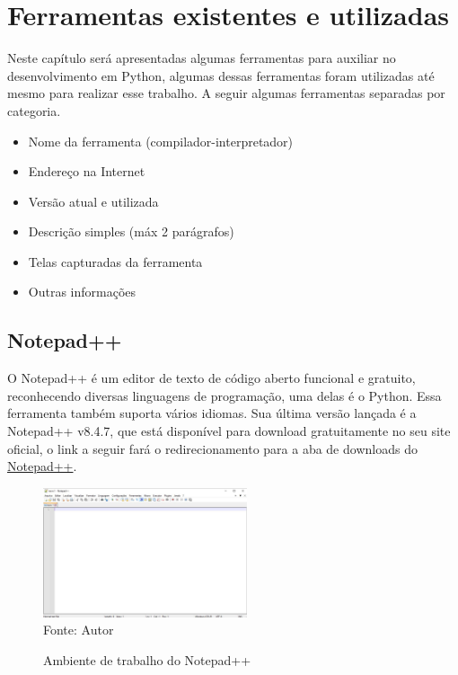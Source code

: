 

\chapter{Ferramentas existentes e utilizadas}

Neste capítulo será apresentadas algumas ferramentas para auxiliar no desenvolvimento em Python, algumas dessas ferramentas foram utilizadas até mesmo para realizar esse trabalho. A seguir algumas ferramentas separadas por categoria.
\begin{itemize}
  \item Nome da ferramenta (compilador-interpretador)
  \item Endere\c{c}o na Internet
  \item Vers\~{a}o atual e utilizada
  \item Descri\c{c}\~{a}o simples (m\'{a}x 2 par\'{a}grafos)
  \item Telas capturadas da ferramenta
  \item Outras informa\c{c}\~{o}es
\end{itemize}

    \section{Notepad++}
	O Notepad++ é um editor de texto de código aberto funcional e gratuito, reconhecendo diversas linguagens de programação, uma delas é o Python. Essa ferramenta também suporta vários idiomas. Sua última versão lançada é a Notepad++ v8.4.7, que está disponível para download gratuitamente no seu site oficial, o link a seguir fará o redirecionamento para a aba de downloads do \href{https://notepad-plus-plus.org/downloads/}{Notepad++}. 
	
	\begin{figure}[H]
		\begin{center}
			\caption{Ambiente de trabalho do Notepad++} \label{ling1}
			\includegraphics[width=6cm]{notepad.JPG} \\
			{\tiny \sf Fonte:{ Autor}}
		\end{center}
	\end{figure}
	
